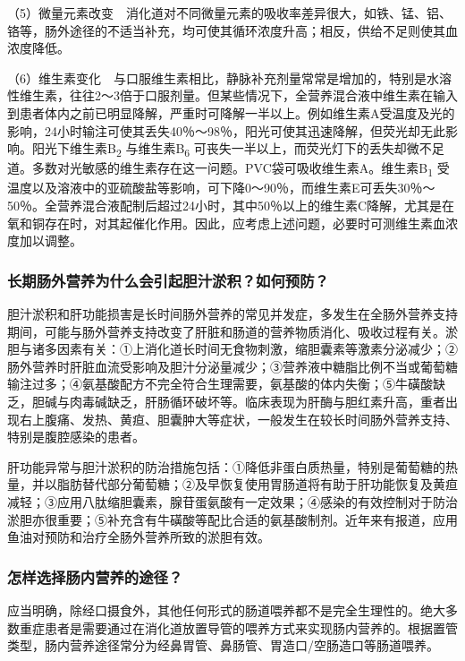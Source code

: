 （5）微量元素改变　消化道对不同微量元素的吸收率差异很大，如铁、锰、铝、铬等，肠外途径的不适当补充，均可使其循环浓度升高；相反，供给不足则使其血浓度降低。

（6）维生素变化　与口服维生素相比，静脉补充剂量常常是增加的，特别是水溶性维生素，往往2～3倍于口服剂量。但某些情况下，全营养混合液中维生素在输入到患者体内之前已明显降解，严重时可降解一半以上。例如维生素A受温度及光的影响，24小时输注可使其丢失40％～98％，阳光可使其迅速降解，但荧光却无此影响。阳光下维生素B\textsubscript{2}
与维生素B\textsubscript{6}
可丧失一半以上，而荧光灯下的丢失却微不足道。多数对光敏感的维生素存在这一问题。PVC袋可吸收维生素A。维生素B\textsubscript{1}
受温度以及溶液中的亚硫酸盐等影响，可下降0～90％，而维生素E可丢失30％～50％。全营养混合液配制后超过24小时，其中50％以上的维生素C降解，尤其是在氧和铜存在时，对其起催化作用。因此，应考虑上述问题，必要时可测维生素血浓度加以调整。

\subsubsection{长期肠外营养为什么会引起胆汁淤积？如何预防？}

胆汁淤积和肝功能损害是长时间肠外营养的常见并发症，多发生在全肠外营养支持期间，可能与肠外营养支持改变了肝脏和肠道的营养物质消化、吸收过程有关。淤胆与诸多因素有关：①上消化道长时间无食物刺激，缩胆囊素等激素分泌减少；②肠外营养时肝脏血流受影响及胆汁分泌量减少；③营养液中糖脂比例不当或葡萄糖输注过多；④氨基酸配方不完全符合生理需要，氨基酸的体内失衡；⑤牛磺酸缺乏，胆碱与肉毒碱缺乏，肝肠循环破坏等。临床表现为肝酶与胆红素升高，重者出现右上腹痛、发热、黄疸、胆囊肿大等症状，一般发生在较长时间肠外营养支持、特别是腹腔感染的患者。

肝功能异常与胆汁淤积的防治措施包括：①降低非蛋白质热量，特别是葡萄糖的热量，并以脂肪替代部分葡萄糖；②及早恢复使用胃肠道将有助于肝功能恢复及黄疸减轻；③应用八肽缩胆囊素，腺苷蛋氨酸有一定效果；④感染的有效控制对于防治淤胆亦很重要；⑤补充含有牛磺酸等配比合适的氨基酸制剂。近年来有报道，应用鱼油对预防和治疗全肠外营养所致的淤胆有效。

\subsubsection{怎样选择肠内营养的途径？}

应当明确，除经口摄食外，其他任何形式的肠道喂养都不是完全生理性的。绝大多数重症患者是需要通过在消化道放置导管的喂养方式来实现肠内营养的。根据置管类型，肠内营养途径常分为经鼻胃管、鼻肠管、胃造口/空肠造口等肠道喂养。


